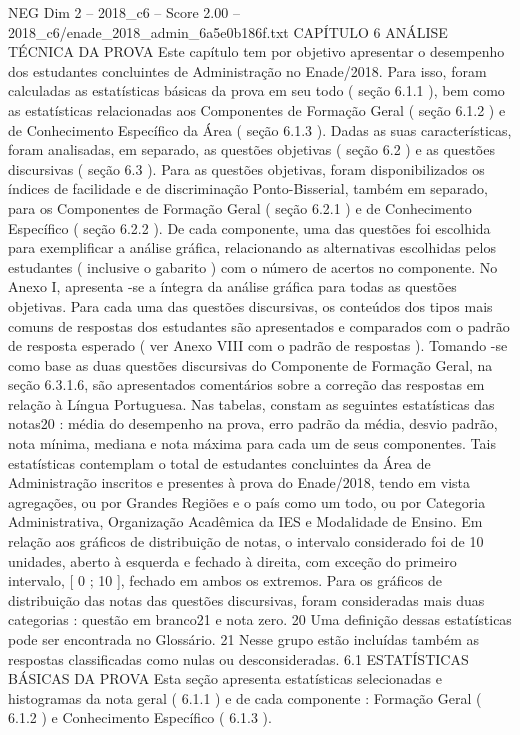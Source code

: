 \begin{textsample}{NEG Dim 2 – 2018\_c6 – Score 2.00 – 2018\_c6/enade\_2018\_admin\_6a5e0b186f.txt}  \label{ex:f2_neg_244}
CAPÍTULO 6 ANÁLISE TÉCNICA DA PROVA Este capítulo tem por objetivo apresentar o desempenho dos estudantes concluintes de Administração no Enade/2018.
Para isso, foram calculadas as estatísticas básicas da prova em seu todo ( seção 6.1.1 ), bem como as estatísticas relacionadas aos Componentes de Formação Geral ( seção 6.1.2 ) e de Conhecimento Específico da Área ( seção 6.1.3 ).
Dadas as suas características, foram analisadas, em separado, as questões objetivas ( seção 6.2 ) e as questões discursivas ( seção 6.3 ).
Para as questões objetivas, foram disponibilizados os índices de facilidade e de discriminação Ponto-Bisserial, também em separado, para os Componentes de Formação Geral ( seção 6.2.1 ) e de Conhecimento Específico ( seção 6.2.2 ).
De cada componente, uma das questões foi escolhida para exemplificar a análise gráfica, relacionando as alternativas escolhidas pelos estudantes ( inclusive o gabarito ) com o número de acertos no componente.
No Anexo I, apresenta -se a íntegra da análise gráfica para todas as questões objetivas.
Para cada uma das questões discursivas, os conteúdos dos tipos mais comuns de respostas dos estudantes são apresentados e comparados com o padrão de resposta esperado ( ver Anexo VIII com o padrão de respostas ).
Tomando -se como base as duas questões discursivas do Componente de Formação Geral, na seção 6.3.1.6, são apresentados comentários sobre a correção das respostas em relação à Língua Portuguesa.
Nas tabelas, constam as seguintes estatísticas das notas20 : média do desempenho na prova, erro padrão da média, desvio padrão, nota mínima, mediana e nota máxima para cada um de seus componentes.
Tais estatísticas contemplam o total de estudantes concluintes da Área de Administração inscritos e presentes à prova do Enade/2018, tendo em vista agregações, ou por Grandes Regiões e o país como um todo, ou por Categoria Administrativa, Organização Acadêmica da IES e Modalidade de Ensino.
Em relação aos gráficos de distribuição de notas, o intervalo considerado foi de 10 unidades, aberto à esquerda e fechado à direita, com exceção do primeiro intervalo, [ 0 ; 10 ], fechado em ambos os extremos.
Para os gráficos de distribuição das notas das questões discursivas, foram consideradas mais duas categorias : questão em branco21 e nota zero. 20 Uma definição dessas estatísticas pode ser encontrada no Glossário. 21 Nesse grupo estão incluídas também as respostas classificadas como nulas ou desconsideradas. 6.1 ESTATÍSTICAS BÁSICAS DA PROVA Esta seção apresenta estatísticas selecionadas e histogramas da nota geral ( 6.1.1 ) e de cada componente : Formação Geral ( 6.1.2 ) e Conhecimento Específico ( 6.1.3 ).

\end{textsample}
